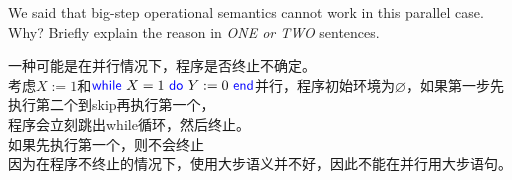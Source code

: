\documentclass[11pt,a4paper]{article}
\let\emptyset\varnothing
\newcommand{\kword}[1]{{\color{blue} \textsf{#1}}}
\newcommand{\While}{\kword{while}}
\newcommand{\Do}{\kword{do}}
\newcommand{\End}{\kword{end}}
\begin{document}
\subproblem We said that big-step operational semantics cannot work in this parallel case. Why?
Briefly explain the reason in \emph{ONE or TWO} sentences.

\begin{solution}
    一种可能是在并行情况下，程序是否终止不确定。\\
    考虑$X:=1$和$\While~X=1 ~\Do~ Y:=0~\End$并行，程序初始环境为$\emptyset$，如果第一步先执行第二个到skip再执行第一个，\\程序会立刻跳出while循环，然后终止。\\如果先执行第一个，则不会终止\\
    因为在程序不终止的情况下，使用大步语义并不好，因此不能在并行用大步语句。
\end{solution}

\end{document}
